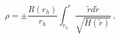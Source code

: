 \begin{equation}
\rho = \pm\frac{R(r_h)}{r_h}\int_{r_h}^{r}\frac{\tilde{r}d\tilde{r}}{\sqrt{H(\tilde{r})}} \ ,
\label{change}
\end{equation}

